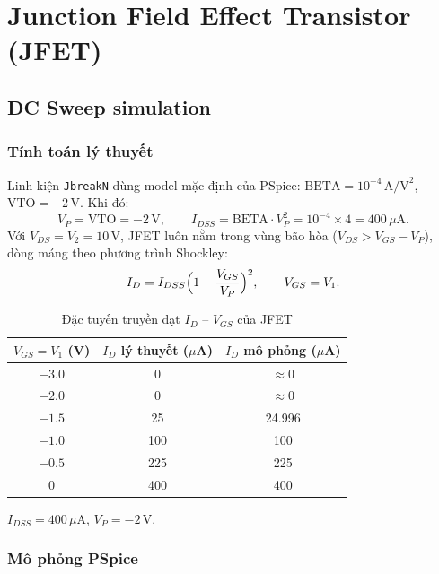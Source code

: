 \section{Junction Field Effect Transistor (JFET)}\label{sec:jfet}

\subsection{DC Sweep simulation}\label{sec:jfet-dc}

\subsubsection*{Tính toán lý thuyết}
Linh kiện \texttt{JbreakN} dùng model mặc định của PSpice: $\text{BETA} = 10^{-4}\,\text{A/V}^2$, $\text{VTO} = -2\,\text{V}$. Khi đó:
\[
V_P = \text{VTO} = -2\,\text{V},\qquad
I_{DSS} = \text{BETA}\cdot V_P^2 = 10^{-4}\times 4 = 400\,\mu\text{A}.
\]
Với $V_{DS} = V_2 = 10\,\text{V}$, JFET luôn nằm trong vùng bão hòa ($V_{DS} > V_{GS} - V_P$), dòng máng theo phương trình Shockley:
\[
I_D = I_{DSS}\Bigl(1 - \frac{V_{GS}}{V_P}\Bigr)^2,\qquad V_{GS} = V_1 .
\]

\begin{table}[H]
\centering
\begin{tabular}{c c c}
\toprule
$V_{GS} = V_1$ (V) & $I_D$ lý thuyết ($\mu$A) & $I_D$ mô phỏng ($\mu$A)\\
\midrule
$-3.0$ & 0   & $\approx 0$\\
$-2.0$ & 0   & $\approx 0$\\
$-1.5$ & 25  & 24.996\\
$-1.0$ & 100 & 100\\
$-0.5$ & 225 & 225\\
$0$    & 400 & 400\\
\bottomrule
\end{tabular}
\caption{Đặc tuyến truyền đạt $I_D$ -- $V_{GS}$ của JFET}
\end{table}

\begin{dapsobox}
$I_{DSS} = 400\,\mu\text{A}$, \quad $V_P = -2\,\text{V}$.
\end{dapsobox}

\subsubsection*{Mô phỏng PSpice}
\simresult
{}

